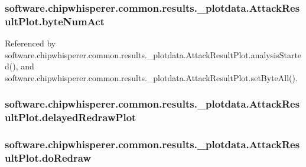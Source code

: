 \subsubsection[{byte\+Num\+Act}]{\setlength{\rightskip}{0pt plus 5cm}software.\+chipwhisperer.\+common.\+results.\+\_\+plotdata.\+Attack\+Result\+Plot.\+byte\+Num\+Act}\label{classsoftware_1_1chipwhisperer_1_1common_1_1results_1_1__plotdata_1_1AttackResultPlot_afd9b72192bfb5d8de5b5c963bff60d6d}


Referenced by software.\+chipwhisperer.\+common.\+results.\+\_\+plotdata.\+Attack\+Result\+Plot.\+analysis\+Started(), and software.\+chipwhisperer.\+common.\+results.\+\_\+plotdata.\+Attack\+Result\+Plot.\+set\+Byte\+All().

\hypertarget{classsoftware_1_1chipwhisperer_1_1common_1_1results_1_1__plotdata_1_1AttackResultPlot_a564265b8d5b6b38341cdeda211044f9c}{}
\subsubsection[{delayed\+Redraw\+Plot}]{\setlength{\rightskip}{0pt plus 5cm}software.\+chipwhisperer.\+common.\+results.\+\_\+plotdata.\+Attack\+Result\+Plot.\+delayed\+Redraw\+Plot}\label{classsoftware_1_1chipwhisperer_1_1common_1_1results_1_1__plotdata_1_1AttackResultPlot_a564265b8d5b6b38341cdeda211044f9c}
\hypertarget{classsoftware_1_1chipwhisperer_1_1common_1_1results_1_1__plotdata_1_1AttackResultPlot_a717d22e257fa005046d2c8ec4b2d5860}{}
\subsubsection[{do\+Redraw}]{\setlength{\rightskip}{0pt plus 5cm}software.\+chipwhisperer.\+common.\+results.\+\_\+plotdata.\+Attack\+Result\+Plot.\+do\+Redraw}\label{classsoftware_1_1chipwhisperer_1_1common_1_1results_1_1__plotdata_1_1AttackResultPlot_a717d22e257fa005046d2c8ec4b2d5860}


